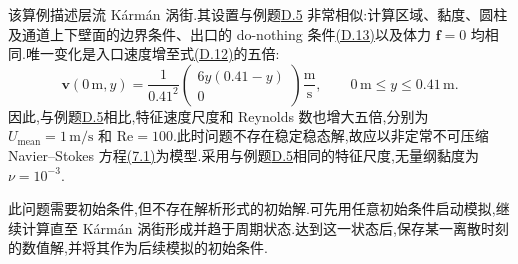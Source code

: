 \begin{example}[定常入口下 $\mathrm{Re}=100$ 的非定常圆柱绕流]\label{ex:appendix-d-8}
该算例描述层流 Kármán 涡街.其设置与例题\hyperref[ex:appendix-d-5]{D.5} 非常相似:计算区域、黏度、圆柱及通道上下壁面的边界条件、出口的 do-nothing 条件\hyperref[eq:appendix-d-13]{(D.13)}以及体力 $\bm f=0$ 均相同.唯一变化是入口速度增至式\hyperref[eq:appendix-d-12]{(D.12)}的五倍:
\begin{equation}\label{eq:appendix-d-25}
\bm v(0\,\mathrm m,y)
=\frac{1}{0.41^2}
\begin{pmatrix}6y(0.41-y)\\0\end{pmatrix}
\frac{\mathrm m}{\mathrm s},
\qquad 0\,\mathrm m\le y\le0.41\,\mathrm m.
\end{equation}
因此,与例题\hyperref[ex:appendix-d-5]{D.5}相比,特征速度尺度和 Reynolds 数也增大五倍,分别为 $U_{\mathrm{mean}}=1\,\mathrm{m/s}$ 和 $\mathrm{Re}=100$.此时问题不存在稳定稳态解,故应以非定常不可压缩 Navier--Stokes 方程\hyperref[eq:time-dependent-ns-strong]{(7.1)}为模型.采用与例题\hyperref[ex:appendix-d-5]{D.5}相同的特征尺度,无量纲黏度为 $\nu=10^{-3}$.

此问题需要初始条件,但不存在解析形式的初始解.可先用任意初始条件启动模拟,继续计算直至 Kármán 涡街形成并趋于周期状态.达到这一状态后,保存某一离散时刻的数值解,并将其作为后续模拟的初始条件.


\end{example}
